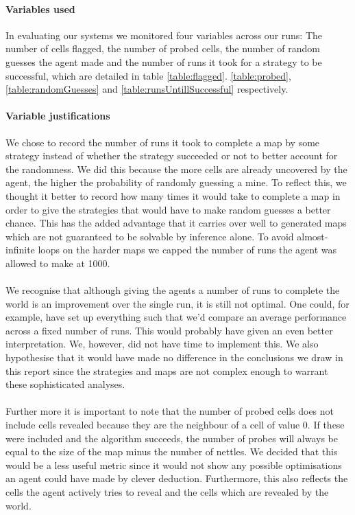 \documentclass[british]{article}
\begin{document}
\paragraph{Variables used} In evaluating our systems we monitored four variables across our runs: The number of cells flagged, the number of probed cells, the number of random guesses the agent made and the number of runs it took for a strategy to be successful, which are detailed in table \ref{table:flagged}. \ref{table:probed}, \ref{table:randomGuesses} and \ref{table:runsUntillSuccessful} respectively.
\paragraph{Variable justifications}We chose to record the number of runs it took to complete a map by some strategy instead of whether the strategy succeeded or not to better account for the randomness. We did this because the more cells are already uncovered by the agent, the higher the probability of randomly guessing a mine. To reflect this, we thought it better to record how many times it would take to complete a map in order to give the strategies that would have to make random guesses a better chance. This has the added advantage that it carries over well to generated maps which are not guaranteed to be solvable by inference alone. To avoid almost-infinite loops on the harder maps we capped the number of runs the agent was allowed to make at 1000.
\paragraph{} We recognise that although giving the agents a number of runs to complete the world is an improvement over the single run, it is still not optimal. One could, for example, have set up everything such that we'd compare an average performance across a fixed number of runs. This would probably have given an even better interpretation. We, however, did not have time to implement this. We also hypothesise that it would have made no difference in the conclusions we draw in this report since the strategies and maps are not complex enough to warrant these sophisticated analyses.
\paragraph{}Further more it is important to note that the number of probed cells does not include cells revealed because they are the neighbour of a cell of value 0. If these were included and the algorithm succeeds, the number of probes will always be equal to the size of the map minus the number of nettles. We decided that this would be a less useful metric since it would not show any possible optimisations an agent could have made by clever deduction. Furthermore, this also reflects the cells the agent actively tries to reveal and the cells which are revealed by the world.
\end{document}
